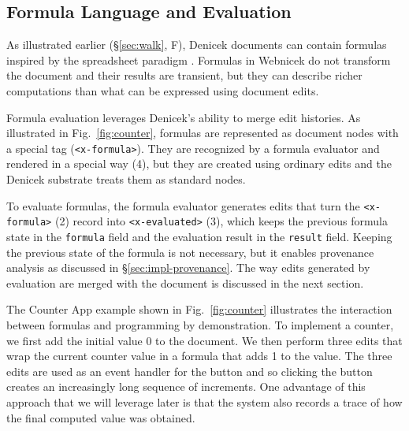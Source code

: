 \documentclass[sigconf,anonymous,screen]{acmart}
\newcommand{\note}[1]{\textcolor{red}{#1}}
\begin{document}

\subsection{Formula Language and Evaluation}
\label{sec:impl-eval}

As illustrated earlier (\S\ref{sec:walk}, F), Denicek documents can contain formulas inspired by the
spreadsheet paradigm \cite{nardi-1990-spreadsheets}. Formulas in Webnicek do not transform the
document and their results are transient, but they can describe richer computations than what can
be expressed using document edits.

Formula evaluation leverages Denicek's ability to merge edit histories.
As illustrated in Fig.~\ref{fig:counter}, formulas are represented as document nodes with a
special tag ({\small\Verb_<x-formula>_}). They are recognized by a formula evaluator and
rendered in a special way (4), but they are created using ordinary
edits and the Denicek substrate treats them as standard nodes.

To evaluate formulas, the formula evaluator generates edits that turn the {\small\Verb_<x-formula>_} (2)
record into {\small\Verb_<x-evaluated>_} (3), which keeps the previous
formula state in the {\small\Verb_formula_} field and the evaluation result in the {\small\Verb_result_} field.
Keeping the previous state of the formula is not necessary, but it enables provenance analysis
as discussed in \S\ref{sec:impl-provenance}. The way edits generated by evaluation are merged
with the document is discussed in the next section.

%

The Counter App example shown in Fig.~\ref{fig:counter} illustrates the interaction between formulas
and programming by demonstration. To implement a counter, we first add the initial value 0 to the
document. We then perform three edits that wrap the current counter value in a formula that adds
1 to the value. The three edits are used as an event handler for the button and so clicking the
button creates an increasingly long sequence of increments. One advantage of this approach that
we will leverage later is that the system also records a trace of how the final computed value
was obtained.
\end{document}
